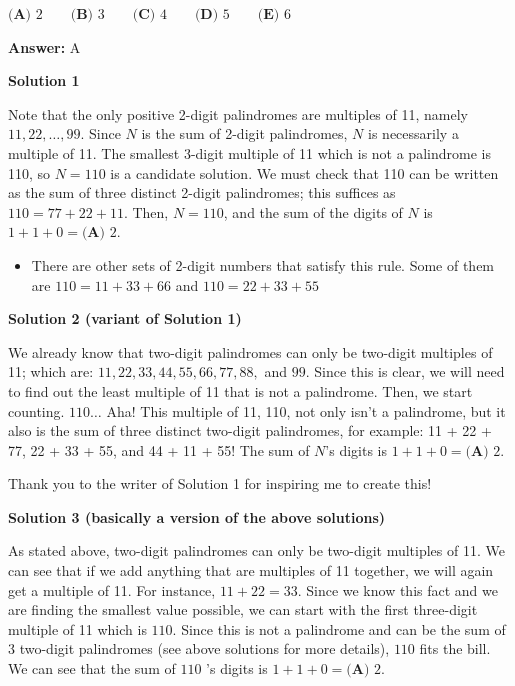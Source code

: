 \begin{enumerate}
 $\textbf{(A) }2\qquad\textbf{(B) }3\qquad\textbf{(C) }4\qquad\textbf{(D) }5\qquad\textbf{(E) }6$

 \textbf{Answer: }A



\textbf{Solution 1}

Note that the only positive 2-digit palindromes are multiples of 11, namely $11, 22, \ldots, 99$. Since $N$ is the sum of 2-digit palindromes, $N$ is necessarily a multiple of 11. The smallest 3-digit multiple of 11 which is not a palindrome is 110, so $N=110$ is a candidate solution. We must check that 110 can be written as the sum of three distinct 2-digit palindromes; this suffices as $110=77+22+11$. Then, $N = 110$, and the sum of the digits of $N$ is $1+1+0 = \boxed{\textbf{(A) }2}$.

 
            \begin{itemize}
        \item There are other sets of 2-digit numbers that satisfy this rule. Some of them are $110 = 11+33+66$ and $110 = 22+33+55$
            \end{itemize}
            



\textbf{Solution 2 (variant of Solution 1)}

We already know that two-digit palindromes can only be two-digit multiples of 11; which are: $11, 22, 33, 44, 55, 66, 77, 88,$ and $99$. Since this is clear, we will need to find out the least multiple of 11 that is not a palindrome. Then, we start counting. $110 \ldots$ Aha! This multiple of 11, 110, not only isn’t a palindrome, but it also is the sum of three distinct two-digit palindromes, for example: 11 + 22 + 77, 22 + 33 + 55, and 44 + 11 + 55! The sum of $N$’s digits is  $1+1+0 = \boxed{\textbf{(A) }2}$.

 Thank you to the writer of Solution 1 for inspiring me to create this!

 



\textbf{Solution 3 (basically a version of the above solutions)}

As stated above, two-digit palindromes can only be two-digit multiples of 11. We can see that if we add anything that are multiples of 11 together, we will again get a multiple of 11. For instance, $11+22=33$. Since we know this fact and we are finding the smallest value possible, we can start with the first three-digit multiple of 11 which is $110$. Since this is not a palindrome and can be the sum of 3 two-digit palindromes (see above solutions for more details), $110$ fits the bill. We can see that the sum of $110$ 's digits is $1+1+0 = \boxed{\textbf{(A) }2}$.


\end{enumerate}
